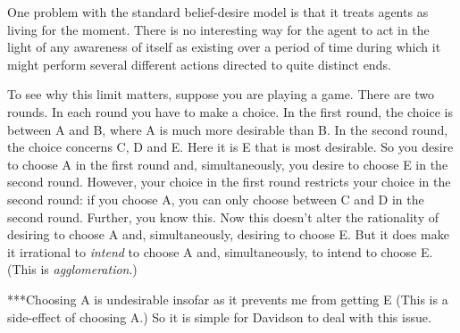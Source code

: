 \documentclass[12pt,\papersize]{extarticle}
\begin{document}
One problem with the standard belief-desire model is that it treats agents as living for the moment.
There is no interesting way for the agent to act in the light of any awareness of itself as existing over a period of time during which it might perform several different actions directed to quite distinct ends.

To see why this limit matters,
suppose you are playing a game.
There are two rounds.
In each round you have to make a choice.
In the first round, the choice is between A and B, where A is much more desirable than B.
In the second round, the choice concerns C, D and E.
Here it is E that is most desirable.
So you desire to choose A in the first round and, simultaneously, you desire to choose E in the second round.
However, your choice in the first round restricts your choice in the second round: if you choose A, you can only choose between C and D in the second round.
Further, you know this.
Now this doesn't alter the rationality of desiring to choose A and, simultaneously, desiring to choose E.
But it does make it irrational to \emph{intend} to choose A and, simultaneously, to intend to choose E.
(This is \emph{agglomeration}.)

***Choosing A is undesirable insofar as it prevents me from getting E
(This is a side-effect of choosing A.)
So it is simple for Davidson to deal with this issue.






\small

\end{document}
